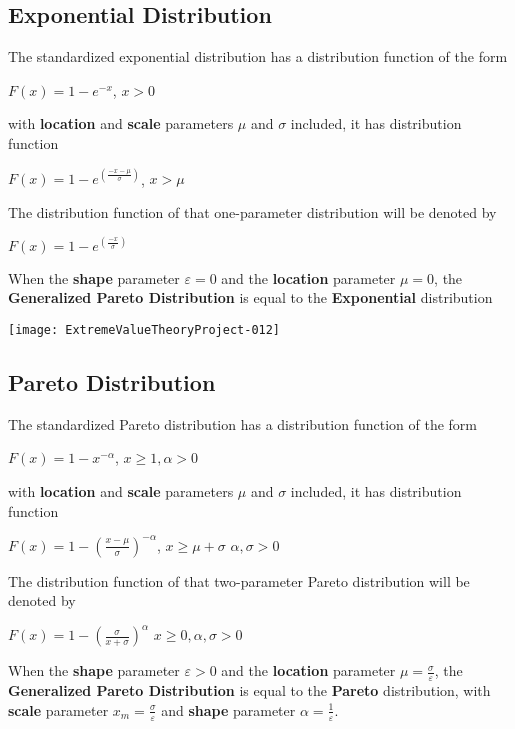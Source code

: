 \documentclass[11pt,a4paper]{article}
\theoremstyle{plain}
\begin{document}
\subsection*{Exponential Distribution}
The standardized exponential distribution has a distribution function of the form
\begin{center}
$F(x)=1-e^{-x}$, $x>0$
\end{center}
with \textbf{location} and \textbf{scale} parameters $\mu$ and $\sigma$ included, it has distribution function
\begin{center}
$F(x)=1-e^{(\frac{-x-\mu}{\sigma})}$, $x>\mu$
\end{center}
The distribution function of that one-parameter distribution will be denoted by
\begin{center}
$F(x)=1-e^{(\frac{-x}{\sigma})}$
\end{center}
When the \textbf{shape} parameter $\varepsilon=0$ and the \textbf{location} parameter $\mu=0$, the \textbf{Generalized Pareto Distribution} is equal to the \textbf{Exponential} distribution 

\texttt{[image: ExtremeValueTheoryProject-012]}

\subsection*{Pareto Distribution}
The standardized Pareto distribution has a distribution function of the form
\begin{center}
$F(x)=1-x^{-\alpha}$, $x\geq 1,\alpha >0$
\end{center}
with \textbf{location} and \textbf{scale} parameters $\mu$ and $\sigma$ included, it has distribution function
\begin{center}
$F(x)=1-(\frac{x-\mu}{\sigma})^{-\alpha}$, $x\geq \mu + \sigma$ $\alpha,\sigma>0$
\end{center}
The distribution function of that two-parameter Pareto distribution will be denoted by
\begin{center}
$F(x)=1-(\frac{\sigma}{x+\sigma})^{\alpha}$ $x \geq 0, \alpha,\sigma>0$
\end{center}

When the \textbf{shape} parameter $\varepsilon>0$ and the \textbf{location} parameter $\mu=\frac{\sigma}{\varepsilon}$, the \textbf{Generalized Pareto Distribution} is equal to the \textbf{Pareto} distribution, with \textbf{scale} parameter $x_m=\frac{\sigma}{\varepsilon}$ and \textbf{shape} parameter $\alpha=\frac{1}{\varepsilon}$.
\end{document}
